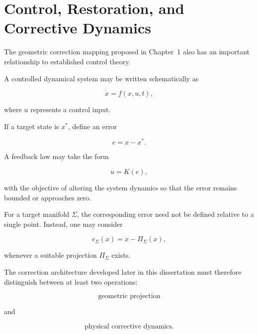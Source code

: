 \documentclass[12pt,oneside]{book}
\begin{document}
\section{Control, Restoration, and Corrective Dynamics}
\label{sec:control-history}

The geometric correction mapping proposed in Chapter~1 also has
an important relationship to established control theory.

A controlled dynamical system may be written schematically as

\begin{equation}
    \dot{x}
    =
    f(x,u,t),
    \label{eq:controlled-system}
\end{equation}

where \(u\) represents a control input.

If a target state is \(x^\ast\), define an error

\begin{equation}
    e
    =
    x-x^\ast.
    \label{eq:control-error}
\end{equation}

A feedback law may take the form

\begin{equation}
    u
    =
    K(e),
    \label{eq:feedback-law}
\end{equation}

with the objective of altering the system dynamics so that the
error remains bounded or approaches zero.

For a target manifold \(\Sigma\), the corresponding error need
not be defined relative to a single point. Instead, one may
consider

\begin{equation}
    e_{\Sigma}(x)
    =
    x
    -
    \Pi_{\Sigma}(x),
    \label{eq:manifold-error}
\end{equation}

whenever a suitable projection \(\Pi_{\Sigma}\) exists.

The correction architecture developed later in this
dissertation must therefore distinguish between at least two
operations:

\begin{equation}
    \text{geometric projection}
\end{equation}

and

\begin{equation}
    \text{physical corrective dynamics}.
\end{equation}
\end{document}
